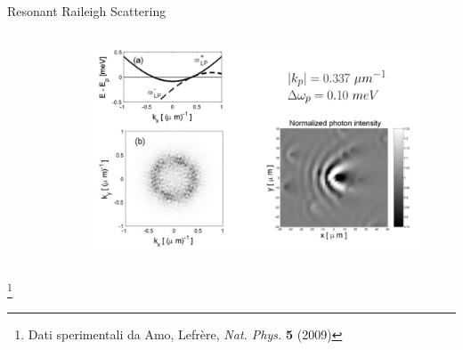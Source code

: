 \documentclass[10pt]{beamer}
\begin{document}
\begin{frame}{Resonant Raileigh Scattering}
\begin{columns}[t]
\begin{column}{.25\textwidth}
\begin{figure}
    \end{figure}
  \end{column}
  \begin{column}{.75\textwidth}
    \begin{figure}
      \includegraphics[width=\columnwidth]{pics/scattering-RRS-teo.png}
    \end{figure}
  \end{column}
\end{columns}
\let\thefootnote\relax\footnote{\scriptsize Dati sperimentali da Amo, Lefrère, \emph{Nat. Phys.} \textbf{5} (2009) }
\end{frame}
\end{document}
